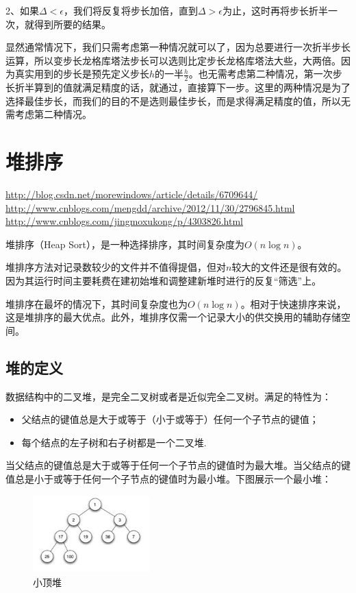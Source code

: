 2、如果$\Delta < \epsilon$，我们将反复将步长加倍，直到$\Delta > \epsilon$为止，这时再将步长折半一次，就得到所要的结果。

显然通常情况下，我们只需考虑第一种情况就可以了，因为总要进行一次折半步长运算，所以变步长龙格库塔法步长可以选则比定步长龙格库塔法大些，大两倍。因为真实用到的步长是预先定义步长$h$的一半$\frac{h}{2}$。也无需考虑第二种情况，第一次步长折半算到的值就满足精度的话，就通过，直接算下一步。这里的两种情况是为了选择最佳步长，而我们的目的不是选则最佳步长，而是求得满足精度的值，所以无需考虑第二种情况。






\chapter{堆排序}
\url{http://blog.csdn.net/morewindows/article/details/6709644/}
\url{http://www.cnblogs.com/mengdd/archive/2012/11/30/2796845.html}
\url{http://www.cnblogs.com/jingmoxukong/p/4303826.html}

堆排序（Heap Sort），是一种选择排序，其时间复杂度为$O(n\log n)$。

堆排序方法对记录数较少的文件并不值得提倡，但对$n$较大的文件还是很有效的。因为其运行时间主要耗费在建初始堆和调整建新堆时进行的反复“筛选”上。

堆排序在最坏的情况下，其时间复杂度也为$O(n\log n)$。相对于快速排序来说，这是堆排序的最大优点。此外，堆排序仅需一个记录大小的供交换用的辅助存储空间。


\section{堆的定义}
数据结构中的二叉堆，是完全二叉树或者是近似完全二叉树。满足的特性为：
\begin{itemize}
\item 父结点的键值总是大于或等于（小于或等于）任何一个子节点的键值；
\item 每个结点的左子树和右子树都是一个二叉堆.
\end{itemize}
当父结点的键值总是大于或等于任何一个子节点的键值时为最大堆。当父结点的键值总是小于或等于任何一个子节点的键值时为最小堆。下图展示一个最小堆：

\begin{figure}[h]
\begin{center}
\includegraphics[width=0.4\textwidth]{pictures/heap.png}
\end{center}
\caption{小顶堆}
\end{figure}

